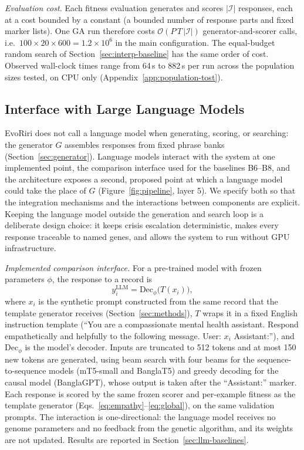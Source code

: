 \documentclass[mathematics,article,submit,xetex,moreauthors]{Definitions/mdpi}
\begin{document}
\emph{Evaluation cost.} Each fitness evaluation generates and scores
$|\mathcal{I}|$ responses, each at a cost bounded by a constant (a bounded
number of response parts and fixed marker lists). One GA run therefore costs
$\mathcal{O}(P\,T\,|\mathcal{I}|)$ generator-and-scorer calls, i.e.\
$100\times20\times600=1.2\times10^{6}$ in the main configuration. The
equal-budget random search of Section~\ref{sec:interp-baseline} has the same
order of cost. Observed wall-clock times range from 64\,s to 882\,s per run
across the population sizes tested, on CPU only
(Appendix~\ref{app:population-tost}).




\subsection{Interface with Large Language Models}
\label{sec:llm-interface}

EvoRiri does not call a language model when generating, scoring, or searching:
the generator $G$ assembles responses from fixed phrase banks
(Section~\ref{sec:generator}). Language models interact with the system at one
implemented point, the comparison interface used for the baselines B6--B8, and
the architecture exposes a second, proposed point at which a language model
could take the place of $G$ (Figure~\ref{fig:pipeline}, layer 5). We specify both
so that the integration mechanisms and the interactions between components are
explicit. Keeping the language model outside the generation and search loop is
a deliberate design choice: it keeps crisis escalation deterministic, makes
every response traceable to named genes, and allows the system to run without
GPU infrastructure.

\emph{Implemented comparison interface.} For a pre-trained model with frozen
parameters $\phi$, the response to a record is
\begin{equation}
\label{eq:llm-baseline}
  y_i^{\mathrm{LLM}} = \mathrm{Dec}_{\phi}\bigl(T(x_i)\bigr),
\end{equation}
where $x_i$ is the synthetic prompt constructed from the same record that the
template generator receives (Section~\ref{sec:methods}), $T$ wraps it in a fixed
English instruction template (``You are a compassionate mental health
assistant. Respond empathetically and helpfully to the following message.
User: $x_i$ Assistant:''), and $\mathrm{Dec}_{\phi}$ is the model's decoder.
Inputs are truncated to 512 tokens and at most 150 new tokens are generated,
using beam search with four beams for the sequence-to-sequence models (mT5-small
and BanglaT5) and greedy decoding for the causal model (BanglaGPT), whose output
is taken after the ``Assistant:'' marker. Each response is scored by the same
frozen scorer and per-example fitness as the template generator
(Eqs.~\eqref{eq:empathy}--\eqref{eq:global}), on the same validation prompts. The
interaction is one-directional: the language model receives no genome
parameters and no feedback from the genetic algorithm, and its weights are not
updated. Results are reported in Section~\ref{sec:llm-baselines}.
\end{document}
